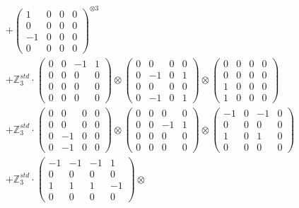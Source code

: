 \documentclass{article}
\begin{document}
{\begin{align}
        &+ \label{Rs16-Rc11-Solution-32-c16} \begin{pmatrix} 1 & 0 & 0 & 0 \\ 0 & 0 & 0 & 0 \\ -1 & 0 & 0 & 0 \\ 0 & 0 & 0 & 0 \end{pmatrix}^{\otimes 3} \\
        &+ \label{Rs16-Rc11-Solution-32-c17} \mathbb{Z}_3^{std} \cdot 
            \begin{pmatrix} 0 & 0 & -1 & 1 \\ 0 & 0 & 0 & 0 \\ 0 & 0 & 0 & 0 \\ 0 & 0 & 0 & 0 \end{pmatrix} \otimes 
            \begin{pmatrix} 0 & 0 & 0 & 0 \\ 0 & -1 & 0 & 1 \\ 0 & 0 & 0 & 0 \\ 0 & -1 & 0 & 1 \end{pmatrix} \otimes 
            \begin{pmatrix} 0 & 0 & 0 & 0 \\ 0 & 0 & 0 & 0 \\ 1 & 0 & 0 & 0 \\ 1 & 0 & 0 & 0 \end{pmatrix} \\ 
        &+ \label{Rs16-Rc11-Solution-32-c18} \mathbb{Z}_3^{std} \cdot 
            \begin{pmatrix} 0 & 0 & 0 & 0 \\ 0 & 0 & 0 & 0 \\ 0 & -1 & 0 & 0 \\ 0 & -1 & 0 & 0 \end{pmatrix} \otimes 
            \begin{pmatrix} 0 & 0 & 0 & 0 \\ 0 & 0 & -1 & 1 \\ 0 & 0 & 0 & 0 \\ 0 & 0 & 0 & 0 \end{pmatrix} \otimes 
            \begin{pmatrix} -1 & 0 & -1 & 0 \\ 0 & 0 & 0 & 0 \\ 1 & 0 & 1 & 0 \\ 0 & 0 & 0 & 0 \end{pmatrix} \\ 
        &+ \label{Rs16-Rc11-Solution-32-c19} \mathbb{Z}_3^{std} \cdot 
            \begin{pmatrix} -1 & -1 & -1 & 1 \\ 0 & 0 & 0 & 0 \\ 1 & 1 & 1 & -1 \\ 0 & 0 & 0 & 0 \end{pmatrix} \otimes 

\end{align}}
\end{document}
